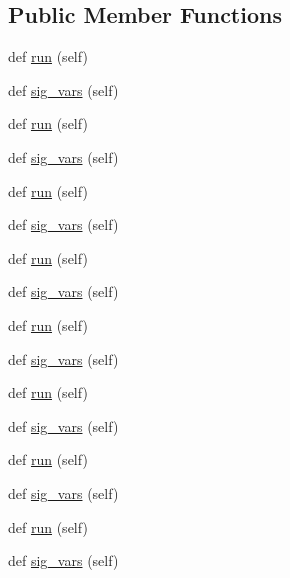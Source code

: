 \subsection*{Public Member Functions}
\begin{DoxyCompactItemize}
\item 
def \hyperlink{classwaflib_1_1_task_gen_1_1subst__pc_acefcbe2a8dfbd03149ac14795807ba50}{run} (self)
\item 
def \hyperlink{classwaflib_1_1_task_gen_1_1subst__pc_a5be5d97b2212f089f27905ddfead668c}{sig\+\_\+vars} (self)
\item 
def \hyperlink{classwaflib_1_1_task_gen_1_1subst__pc_acefcbe2a8dfbd03149ac14795807ba50}{run} (self)
\item 
def \hyperlink{classwaflib_1_1_task_gen_1_1subst__pc_a5be5d97b2212f089f27905ddfead668c}{sig\+\_\+vars} (self)
\item 
def \hyperlink{classwaflib_1_1_task_gen_1_1subst__pc_acefcbe2a8dfbd03149ac14795807ba50}{run} (self)
\item 
def \hyperlink{classwaflib_1_1_task_gen_1_1subst__pc_a5be5d97b2212f089f27905ddfead668c}{sig\+\_\+vars} (self)
\item 
def \hyperlink{classwaflib_1_1_task_gen_1_1subst__pc_acefcbe2a8dfbd03149ac14795807ba50}{run} (self)
\item 
def \hyperlink{classwaflib_1_1_task_gen_1_1subst__pc_a5be5d97b2212f089f27905ddfead668c}{sig\+\_\+vars} (self)
\item 
def \hyperlink{classwaflib_1_1_task_gen_1_1subst__pc_acefcbe2a8dfbd03149ac14795807ba50}{run} (self)
\item 
def \hyperlink{classwaflib_1_1_task_gen_1_1subst__pc_a5be5d97b2212f089f27905ddfead668c}{sig\+\_\+vars} (self)
\item 
def \hyperlink{classwaflib_1_1_task_gen_1_1subst__pc_acefcbe2a8dfbd03149ac14795807ba50}{run} (self)
\item 
def \hyperlink{classwaflib_1_1_task_gen_1_1subst__pc_a5be5d97b2212f089f27905ddfead668c}{sig\+\_\+vars} (self)
\item 
def \hyperlink{classwaflib_1_1_task_gen_1_1subst__pc_acefcbe2a8dfbd03149ac14795807ba50}{run} (self)
\item 
def \hyperlink{classwaflib_1_1_task_gen_1_1subst__pc_a5be5d97b2212f089f27905ddfead668c}{sig\+\_\+vars} (self)
\item 
def \hyperlink{classwaflib_1_1_task_gen_1_1subst__pc_acefcbe2a8dfbd03149ac14795807ba50}{run} (self)
\item 
def \hyperlink{classwaflib_1_1_task_gen_1_1subst__pc_a5be5d97b2212f089f27905ddfead668c}{sig\+\_\+vars} (self)

\end{DoxyCompactItemize}
